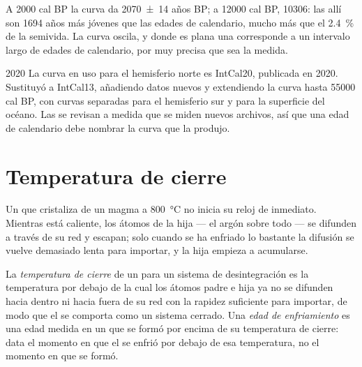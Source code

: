 A \num{2000} cal BP la curva da \num[uncertainty-mode=separate]{2070 \pm 14} años BP; a
\num{12000} cal BP, \num{10306}: las  allí son \num{1694} años más jóvenes que las edades de calendario, mucho más que el \qty{2.4}{\percent} de la semivida. La curva oscila, y donde es plana una  corresponde a un intervalo largo de edades de calendario, por muy precisa que sea la medida.

\begin{dated}{2020}
La curva en uso para el hemisferio norte es IntCal20, publicada en 2020. Sustituyó a IntCal13, añadiendo datos nuevos y extendiendo la curva hasta \num{55000} cal BP,
con curvas separadas para el hemisferio sur y para la superficie del océano. Las  se revisan a medida que se miden nuevos archivos, así que una edad de calendario debe nombrar la curva que la produjo.
\end{dated}

\section{Temperatura de cierre}\label{sec:b1:radiometric-methods:closure}

Un  que cristaliza de un magma a \qty{800}{\celsius} no inicia su reloj de inmediato. Mientras está caliente, los átomos de la hija --- el argón sobre todo ---
se difunden a través de su red y escapan; solo cuando se ha enfriado lo bastante la difusión se vuelve demasiado lenta para importar, y la hija empieza a acumularse.

\begin{definition}\label{def:b1:radiometric-methods:closure}
La \emph{temperatura de cierre} de un  para un sistema de desintegración es la temperatura por debajo de la cual los átomos padre e hija ya no se difunden hacia dentro ni hacia fuera de su red con la rapidez suficiente para importar, de modo que el  se comporta como un sistema cerrado. Una \emph{edad de enfriamiento} es una edad medida en un  que se formó por encima de su temperatura de cierre: data el momento en que el  se enfrió por debajo de esa temperatura, no el momento en que se formó.
\end{definition}

